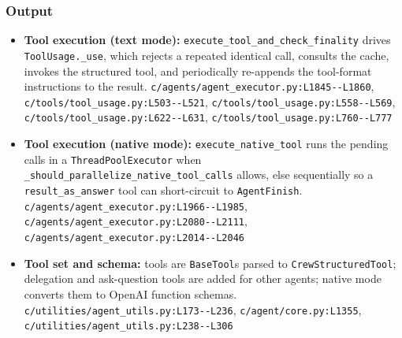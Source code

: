 \subsubsection*{Output}
\begin{itemize}
\item \textbf{Tool execution (text mode):} \texttt{execute\_\allowbreak{}tool\_\allowbreak{}and\_\allowbreak{}check\_\allowbreak{}finality} drives \texttt{ToolUsage.\allowbreak{}\_\allowbreak{}use}, which rejects a repeated identical call, consults the cache, invokes the structured tool, and periodically re-appends the tool-format instructions to the result. \texttt{c/\allowbreak{}agents/\allowbreak{}agent\_\allowbreak{}executor.\allowbreak{}py:\allowbreak{}L1845-\allowbreak{}-\allowbreak{}L1860}, \texttt{c/\allowbreak{}tools/\allowbreak{}tool\_\allowbreak{}usage.\allowbreak{}py:\allowbreak{}L503-\allowbreak{}-\allowbreak{}L521}, \texttt{c/\allowbreak{}tools/\allowbreak{}tool\_\allowbreak{}usage.\allowbreak{}py:\allowbreak{}L558-\allowbreak{}-\allowbreak{}L569}, \texttt{c/\allowbreak{}tools/\allowbreak{}tool\_\allowbreak{}usage.\allowbreak{}py:\allowbreak{}L622-\allowbreak{}-\allowbreak{}L631}, \texttt{c/\allowbreak{}tools/\allowbreak{}tool\_\allowbreak{}usage.\allowbreak{}py:\allowbreak{}L760-\allowbreak{}-\allowbreak{}L777}
\item \textbf{Tool execution (native mode):} \texttt{execute\_\allowbreak{}native\_\allowbreak{}tool} runs the pending calls in a \texttt{ThreadPoolExecutor} when \texttt{\_\allowbreak{}should\_\allowbreak{}parallelize\_\allowbreak{}native\_\allowbreak{}tool\_\allowbreak{}calls} allows, else sequentially so a \texttt{result\_\allowbreak{}as\_\allowbreak{}answer} tool can short-circuit to \texttt{AgentFinish}. \texttt{c/\allowbreak{}agents/\allowbreak{}agent\_\allowbreak{}executor.\allowbreak{}py:\allowbreak{}L1966-\allowbreak{}-\allowbreak{}L1985}, \texttt{c/\allowbreak{}agents/\allowbreak{}agent\_\allowbreak{}executor.\allowbreak{}py:\allowbreak{}L2080-\allowbreak{}-\allowbreak{}L2111}, \texttt{c/\allowbreak{}agents/\allowbreak{}agent\_\allowbreak{}executor.\allowbreak{}py:\allowbreak{}L2014-\allowbreak{}-\allowbreak{}L2046}
\item \textbf{Tool set and schema:} tools are \texttt{BaseTool}s parsed to \texttt{CrewStructuredTool}; delegation and ask-question tools are added for other agents; native mode converts them to OpenAI function schemas. \texttt{c/\allowbreak{}utilities/\allowbreak{}agent\_\allowbreak{}utils.\allowbreak{}py:\allowbreak{}L173-\allowbreak{}-\allowbreak{}L236}, \texttt{c/\allowbreak{}agent/\allowbreak{}core.\allowbreak{}py:\allowbreak{}L1355}, \texttt{c/\allowbreak{}utilities/\allowbreak{}agent\_\allowbreak{}utils.\allowbreak{}py:\allowbreak{}L238-\allowbreak{}-\allowbreak{}L306}

\end{itemize}
